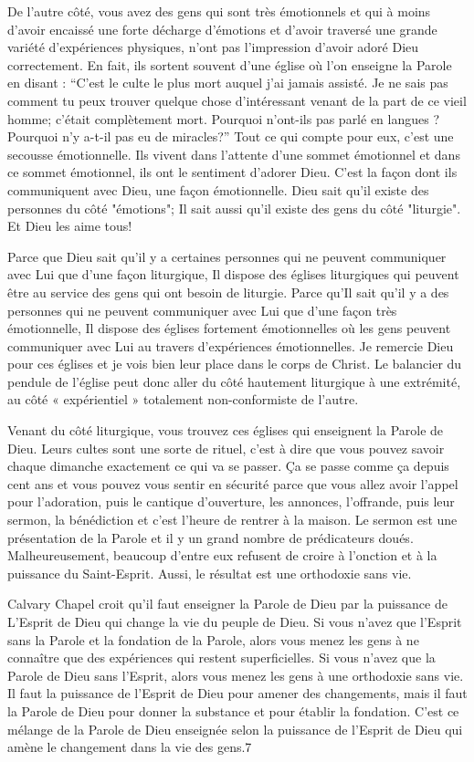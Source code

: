 De l’autre côté, vous avez des gens qui sont très émotionnels et qui à moins d’avoir encaissé une forte décharge
d'émotions et d'avoir traversé une grande variété d'expériences physiques, n’ont pas l’impression d’avoir adoré Dieu
correctement. En fait, ils sortent souvent d’une église où l’on enseigne la Parole en disant : “C’est le culte le plus mort
auquel j’ai jamais assisté. Je ne sais pas comment tu peux trouver quelque chose d’intéressant venant de la part de
ce vieil homme; c’était complètement mort. Pourquoi n’ont-ils pas parlé en langues ? Pourquoi n'y a-t-il pas eu de
miracles?” Tout ce qui compte pour eux, c'est une secousse émotionnelle. Ils vivent dans l’attente d’une sommet
émotionnel et dans ce sommet émotionnel, ils ont le sentiment d’adorer Dieu. C’est la façon dont ils communiquent
avec Dieu, une façon émotionnelle. Dieu sait qu’il existe des personnes du côté "émotions"; Il sait aussi qu’il existe
des gens du côté "liturgie". Et Dieu les aime tous!

Parce que Dieu sait qu’il y a certaines personnes qui ne peuvent communiquer avec Lui que d’une façon liturgique, Il
dispose des églises liturgiques qui peuvent être au service des gens qui ont besoin de liturgie. Parce qu'Il sait qu’il y a
des personnes qui ne peuvent communiquer avec Lui que d’une façon très émotionnelle, Il dispose des églises
fortement émotionnelles où les gens peuvent communiquer avec Lui au travers d’expériences émotionnelles. Je
remercie Dieu pour ces églises et je vois bien leur place dans le corps de Christ. Le balancier du pendule de l’église
peut donc aller du côté hautement liturgique à une extrémité, au côté « expérientiel » totalement non-conformiste de
l’autre.

Venant du côté liturgique, vous trouvez ces églises qui enseignent la Parole de Dieu. Leurs cultes sont une sorte de
rituel, c’est à dire que vous pouvez savoir chaque dimanche exactement ce qui va se passer. Ça se passe comme ça
depuis cent ans et vous pouvez vous sentir en sécurité parce que vous allez avoir l’appel pour l’adoration, puis le
cantique d’ouverture, les annonces, l’offrande, puis leur sermon, la bénédiction et c’est l’heure de rentrer à la maison.
Le sermon est une présentation de la Parole et il y un grand nombre de prédicateurs doués. Malheureusement,
beaucoup d’entre eux refusent de croire à l’onction et à la puissance du Saint-Esprit. Aussi, le résultat est une
orthodoxie sans vie.

Calvary Chapel croit qu'il faut enseigner la Parole de Dieu par la puissance de L’Esprit de Dieu qui change la vie du
peuple de Dieu. Si vous n’avez que l’Esprit sans la Parole et la fondation de la Parole, alors vous menez les gens à ne
connaître que des expériences qui restent superficielles. Si vous n’avez que la Parole de Dieu sans l’Esprit, alors vous
menez les gens à une orthodoxie sans vie. Il faut la puissance de l’Esprit de Dieu pour amener des changements,
mais il faut la Parole de Dieu pour donner la substance et pour établir la fondation. C’est ce mélange de la Parole de
Dieu enseignée selon la puissance de l’Esprit de Dieu qui amène le changement dans la vie des gens.7

